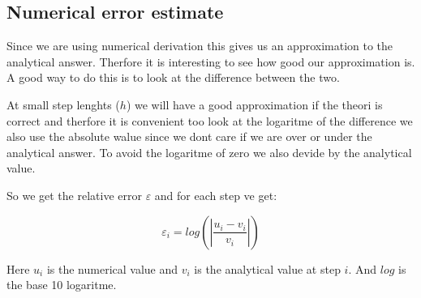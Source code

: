 \documentclass[twoside,twocolumn]{article}
\newcommand{\nl}{

\medskip
\noindent
}
\begin{document}
\subsection{Numerical error estimate}

Since we are using numerical derivation this gives us an approximation to the analytical answer.
Therfore it is interesting to see how good our approximation is.    
A good way to do this is to look at the difference between the two.
\nl
At small step lenghts ($h$) we will have a good approximation if the theori is correct and therfore it is convenient too look at the logaritme of the difference we also use the absolute walue since we dont care if we are over or under the analytical answer. To avoid the logaritme of zero we also devide by the analytical value.
\nl
So we get the relative error $\varepsilon$ and for each step ve get:

\begin{equation}
\varepsilon_i = log\left(\left|\frac{u_i - v_i}{v_i}\right|\right)
\end{equation}

Here $u_i$ is the numerical value and $v_i$ is the analytical value at step $i$. And $log$ is the base 10 logaritme.
\end{document}
